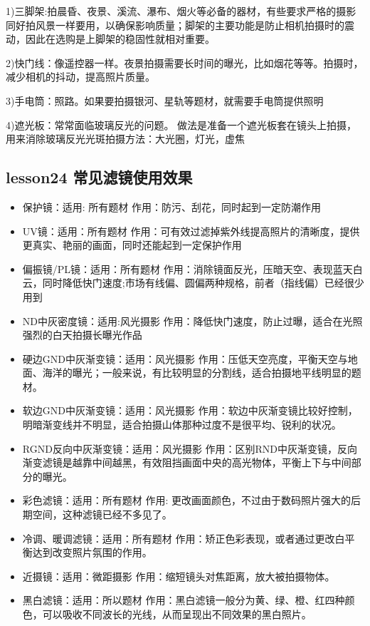 \documentclass{book}
\begin{document}
1)三脚架:拍晨昏、夜景、溪流、瀑布、烟火等必备的器材，有些要求严格的摄影同好拍风景一样要用，以确保影响质量；脚架的主要功能是防止相机拍摄时的震动，因此在选购是上脚架的稳固性就相对重要。

2)快门线：像遥控器一样。夜景拍摄需要长时间的曝光，比如烟花等等。拍摄时，减少相机的抖动，提高照片质量。

3)手电筒：照路。如果要拍摄银河、星轨等题材，就需要手电筒提供照明

4)遮光板：常常面临玻璃反光的问题。  做法是准备一个遮光板套在镜头上拍摄，用来消除玻璃反光光斑拍摄方法：大光圈，灯光，虚焦

\subsection{lesson24 常见滤镜使用效果}

\begin{itemize}
  \item 保护镜：适用: 所有题材  作用：防污、刮花，同时起到一定防潮作用
  \item UV镜：适用：所有题材  作用：可有效过滤掉紫外线提高照片的清晰度，提供更真实、艳丽的画面，同时还能起到一定保护作用
  \item 偏振镜/PL镜：适用：所有题材 作用：消除镜面反光，压暗天空、表现蓝天白云，同时降低快门速度;市场有线偏、圆偏两种规格，前者（指线偏）已经很少用到
  \item ND中灰密度镜：适用:风光摄影  作用：降低快门速度，防止过曝，适合在光照强烈的白天拍摄长曝光作品
  \item 硬边GND中灰渐变镜：适用：风光摄影 作用：压低天空亮度，平衡天空与地面、海洋的曝光；一般来说，有比较明显的分割线，适合拍摄地平线明显的题材。
  \item 软边GND中灰渐变镜：适用：风光摄影  作用：软边中灰渐变镜比较好控制，明暗渐变线并不明显，适合拍摄山体那种过度不是很平均、锐利的状况。
  \item RGND反向中灰渐变镜：适用：风光摄影  作用：区别RND中灰渐变镜，反向渐变滤镜是越靠中间越黑，有效阻挡画面中央的高光物体，平衡上下与中间部分的曝光。
  \item 彩色滤镜：适用：所有题材 作用: 更改画面颜色，不过由于数码照片强大的后期空间，这种滤镜已经不多见了。
  \item 冷调、暖调滤镜：适用：所有题材  作用：矫正色彩表现，或者通过更改白平衡达到改变照片氛围的作用。
  \item 近摄镜：适用：微距摄影  作用：缩短镜头对焦距离，放大被拍摄物体。
  \item 黑白滤镜：适用：所以题材  作用：黑白滤镜一般分为黄、绿、橙、红四种颜色，可以吸收不同波长的光线，从而呈现出不同效果的黑白照片。
\end{itemize}
\end{document}
